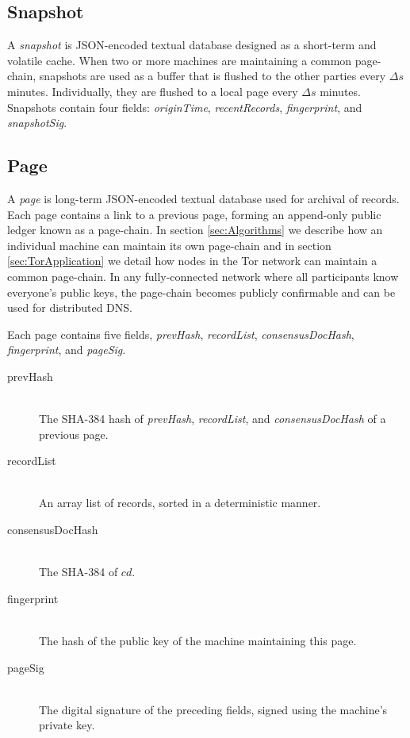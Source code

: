 \subsection{Snapshot}

A \emph{snapshot} is JSON-encoded textual database designed as a short-term and volatile cache. When two or more machines are maintaining a common page-chain, snapshots are used as a buffer that is flushed to the other parties every $ \Delta s $ minutes. Individually, they are flushed to a local page every $ \Delta s $ minutes. Snapshots contain four fields: \emph{originTime}, \emph{recentRecords}, \emph{fingerprint}, and \emph{snapshotSig}.



\subsection{Page}
\label{sec:Page}

A \emph{page} is long-term JSON-encoded textual database used for archival of records. Each page contains a link to a previous page, forming an append-only public ledger known as a page-chain. In section \ref{sec:Algorithms} we describe how an individual machine can maintain its own page-chain and in section \ref{sec:TorApplication} we detail how nodes in the Tor network can maintain a common page-chain. In any fully-connected network where all participants know everyone's public keys, the page-chain becomes publicly confirmable and can be used for distributed DNS.

Each page contains five fields, \emph{prevHash}, \emph{recordList}, \emph{consensusDocHash}, \emph{fingerprint}, and \emph{pageSig}.

\begin{description}
	\item[prevHash] \hfill \\
		The SHA-384 hash of \emph{prevHash}, \emph{recordList}, and \emph{consensusDocHash} of a previous page.
	\item[recordList] \hfill \\
		An array list of records, sorted in a deterministic manner.
	\item[consensusDocHash] \hfill \\
		The SHA-384 of $ cd $.
	\item[fingerprint] \hfill \\
		The hash of the public key of the machine maintaining this page.
	\item[pageSig] \hfill \\
		The digital signature of the preceding fields, signed using the machine's private key.
\end{description}

